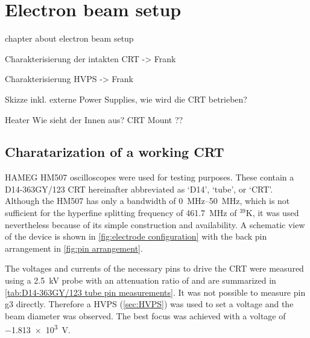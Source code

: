 \chapter{Electron beam setup}\label{ch:Electron beam setup}

chapter about electron beam setup

Charakterisierung der intakten CRT -> Frank 

Charakterisierung HVPS ->  Frank 

Skizze inkl. externe Power Supplies, wie wird die CRT betrieben?

Heater
Wie sieht der Innen aus? 
CRT Mount ??

\section{Charatarization of a working CRT}\label{sec:Charatarization of a working CRT}

HAMEG HM507 oscilloscopes were used for testing purposes. These contain a D14-363GY/123\autocite{D14363GY123-manual} CRT hereinafter abbreviated as `D14', `tube', or `CRT'. Although the HM507 has only a bandwidth of \SIrange{0}{50}{\mega\hertz}, which is not sufficient for the hyperfine splitting frequency of \SI{461.7}{\mega\hertz} of $^{39}\mathrm{K}$, it was used nevertheless because of its simple construction and availability. A schematic view of the device is shown in \cref{fig:electrode configuration} with the back pin arrangement in \cref{fig:pin arrangement}.

The voltages and currents of the necessary pins to drive the CRT were measured using a \SI{2.5}{\kilo\volt} probe  with an attenuation ratio of  and are summarized in \cref{tab:D14-363GY/123 tube pin measurements}. It was not possible to measure pin g3 directly. Therefore a HVPS (\cref{sec:HVPS}) was used to set a voltage and the beam diameter was observed. The best focus was achieved with a voltage of \SI{-1.813e3}{\volt}.

